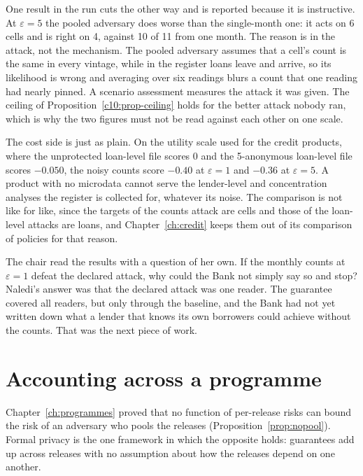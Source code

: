 One result in the run cuts the other way and is reported because it is
instructive. At $\varepsilon = 5$ the pooled adversary does worse than the
single-month one: it acts on 6 cells and is right on 4, against 10 of 11 from one
month.
The reason is in the attack, not the mechanism. The pooled adversary assumes that a
cell's count is the same in every vintage, while in the register loans leave and
arrive, so its likelihood is wrong and averaging over six readings blurs a count
that one reading had nearly pinned. A scenario assessment measures the attack it
was given. The ceiling of Proposition~\ref{c10:prop-ceiling} holds for the better
attack nobody ran, which is why the two figures must not be read against each
other on one scale.

The cost side is just as plain. On the utility scale used for the credit products,
where the unprotected loan-level file scores 0 and the 5-anonymous loan-level file
scores $-0.050$, the noisy counts score $-0.40$ at $\varepsilon = 1$ and $-0.36$ at
$\varepsilon = 5$.
A product with no microdata cannot serve the lender-level and concentration
analyses the register is collected for, whatever its noise. The comparison is not
like for like, since the targets of the counts attack are cells and those of the
loan-level attacks are loans, and Chapter~\ref{ch:credit} keeps them out of its
comparison of policies for that reason.

The chair read the results with a question of her own. If the monthly counts at
$\varepsilon = 1$ defeat the declared attack, why could the Bank not simply say so
and stop? Naledi's answer was that the declared attack was one reader. The
guarantee covered all readers, but only through the baseline, and the Bank had not
yet written down what a lender that knows its own borrowers could achieve without
the counts. That was the next piece of work.

\section{Accounting across a programme}

Chapter~\ref{ch:programmes} proved that no function of per-release risks can bound
the risk of an adversary who pools the releases (Proposition~\ref{prop:nopool}).
Formal privacy is the one framework in which the opposite holds: guarantees add up
across releases with no assumption about how the releases depend on one another.

